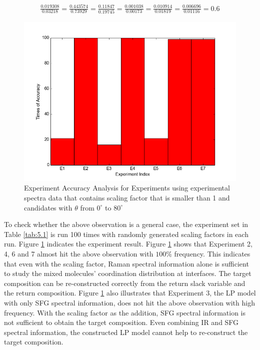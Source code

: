 \begin{eqnarray} \label{eqn:6.3}
\frac{0.019308}{0.03218} = \frac{0.443574}{0.73929} = \frac{0.11847}{0.19745} =\frac{0.001038}{0.00173}  = \frac{0.010914}{0.01819} = \frac{0.006696}{0.01116} = 0.6
\end{eqnarray}

\begin{figure}[!ht] 
\centering
\includegraphics[scale=0.5]{Figures/chapter6_1.png}
\caption{Experiment Accuracy Analysis for Experiments using experimental spectra data that contains scaling factor that is smaller than 1 and candidates with $\theta$ from $0^{\circ}$ to $80^{\circ}$}
\label{fig:6.3}
\end{figure}

To check whether the above observation is a general case, the experiment set in Table \ref{tab:5.1} is run 100 times with randomly generated scaling factors in each run. Figure \ref{fig:6.3} indicates the experiment result. Figure \ref{fig:6.3} shows that Experiment 2, 4, 6 and 7 almost hit the above observation with $100\%$ frequency. This indicates that even with the scaling factor, Raman spectral information alone is sufficient to study the mixed molecules' coordination distribution at interfaces. The target composition can be re-constructed correctly from the return slack variable and the return composition. Figure \ref{fig:6.3} also illustrates that Experiment 3, the LP model with only SFG spectral information, does not hit the above observation with high frequency. With the scaling factor as the addition, SFG spectral information is not sufficient to obtain the target composition. Even combining IR and SFG spectral information, the constructed LP model cannot help to re-construct the target composition. \\

